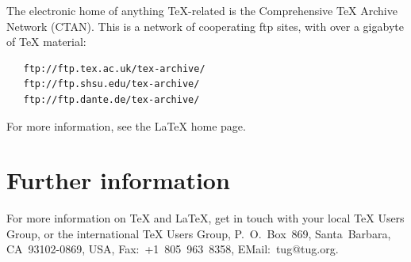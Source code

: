 \documentclass{ltnews}
\begin{document}
The electronic home of anything \TeX-related is the Comprehensive
\TeX{} Archive Network (CTAN).  This is a network of cooperating ftp
sites, with over a gigabyte of \TeX{} material:
\begin{verbatim}
   ftp://ftp.tex.ac.uk/tex-archive/
   ftp://ftp.shsu.edu/tex-archive/
   ftp://ftp.dante.de/tex-archive/
\end{verbatim}
For more information, see the \LaTeX{} home page.

\section{Further information}

For more information on \TeX{} and \LaTeX, get in touch with your local
\TeX{} Users Group, or the international \TeX{} Users Group,
P.~O.~Box~869, Santa~Barbara, CA~93102-0869, USA, Fax:~+1~805~963~8358,
EMail:~tug@tug.org.
\end{document}
